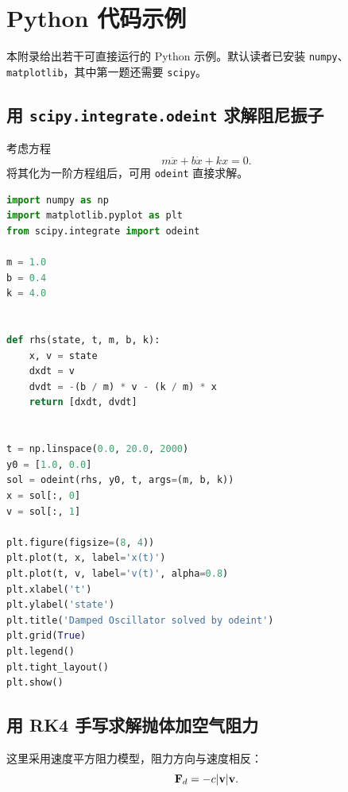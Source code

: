 \chapter{Python 代码示例}

本附录给出若干可直接运行的 Python 示例。默认读者已安装 \texttt{numpy}、\texttt{matplotlib}，其中第一题还需要 \texttt{scipy}。

\section{用 \texttt{scipy.integrate.odeint} 求解阻尼振子}

考虑方程
\[
 m\ddot x+b\dot x+kx=0.
\]
将其化为一阶方程组后，可用 \texttt{odeint} 直接求解。

\begin{lstlisting}[language=Python]
import numpy as np
import matplotlib.pyplot as plt
from scipy.integrate import odeint

m = 1.0
b = 0.4
k = 4.0


def rhs(state, t, m, b, k):
    x, v = state
    dxdt = v
    dvdt = -(b / m) * v - (k / m) * x
    return [dxdt, dvdt]


t = np.linspace(0.0, 20.0, 2000)
y0 = [1.0, 0.0]
sol = odeint(rhs, y0, t, args=(m, b, k))
x = sol[:, 0]
v = sol[:, 1]

plt.figure(figsize=(8, 4))
plt.plot(t, x, label='x(t)')
plt.plot(t, v, label='v(t)', alpha=0.8)
plt.xlabel('t')
plt.ylabel('state')
plt.title('Damped Oscillator solved by odeint')
plt.grid(True)
plt.legend()
plt.tight_layout()
plt.show()
\end{lstlisting}

\section{用 RK4 手写求解抛体加空气阻力}

这里采用速度平方阻力模型，阻力方向与速度相反：
\[
\vb{F}_d=-c\abs{\vb{v}}\vb{v}.
\]

